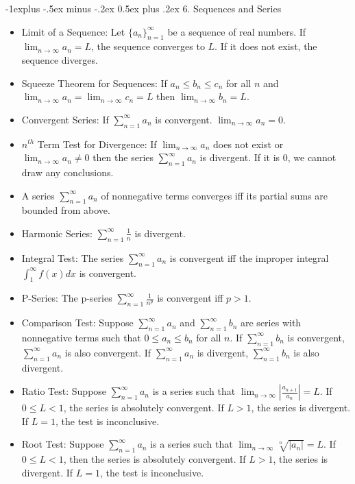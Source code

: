 \documentclass[10pt, portrait]{article}
\makeatletter
\renewcommand{\section}{\@startsection{section}{1}{0mm}%
                                {-1ex plus -.5ex minus -.2ex}%
                                {0.5ex plus .2ex}%
                                {\normalfont\large\bfseries}}
\renewcommand{\section}{\@startsection{section}{2}{0mm}%
                                {-1explus -.5ex minus -.2ex}%
                                {0.5ex plus .2ex}%
                                {\normalfont\normalsize\bfseries}}
\makeatother
\begin{document}
\begin{multicols*}{2}
\section{6. Sequences and Series}
\begin{itemize}
    \item Limit of a Sequence: Let $\{a_n\}_{n=1}^\infty$ be a sequence of real numbers. If $\lim_{n\to \infty}a_n=L$, the sequence converges to $L$. If it does not exist, the sequence diverges.
    \item Squeeze Theorem for Sequences: If $a_n\leq b_n \leq c_n$ for all $n$ and $\lim_{n \to \infty}a_n=\lim_{n \to \infty}c_n=L$ then $\lim_{n \to \infty}b_n=L$.
    \item Convergent Series: If $\sum_{n=1}^\infty a_n$ is convergent. $\lim_{n\to \infty}a_n=0$.
    \item $n^{th}$ Term Test for Divergence: If $\lim_{n\to \infty}a_n$ does not exist or $\lim_{n\to \infty}a_n \neq 0$ then the series $\sum_{n=1}^{\infty}a_n$ is divergent. If it is 0, we cannot draw any conclusions.
    \item A series $\sum_{n=1}^\infty a_n$ of nonnegative terms converges iff its partial sums are bounded from above.
    \item Harmonic Series: $\sum_{n=1}^{\infty}\frac{1}{n}$ is divergent.
    \item Integral Test: The series $\sum_{n=1}^\infty a_n$ is convergent iff the improper integral $\int_1^\infty f(x)dx$ is convergent.
    \item P-Series: The p-series $\sum_{n=1}^\infty \frac{1}{n^p}$ is convergent iff $p > 1$.
    \item Comparison Test: Suppose $\sum_{n=1}^\infty a_n$ and $\sum_{n=1}^\infty b_n$ are series with nonnegative terms such that $0 \leq a_n\leq b_n$ for all $n$. If $\sum_{n=1}^\infty b_n$ is convergent, $\sum_{n=1}^\infty a_n$ is also convergent. If $\sum_{n=1}^\infty a_n$ is divergent, $\sum_{n=1}^\infty b_n$ is also divergent.
    \item Ratio Test: Suppose $\sum_{n=1}^\infty a_n$ is a series such that $\lim_{n\to \infty}|\frac{a_{n+1}}{a_n}|=L$. If $0\leq L < 1$, the series is absolutely convergent. If $L>1$, the series is divergent. If $L=1$, the test is inconclusive.
    \item Root Test: Suppose $\sum_{n=1}^\infty a_n$ is a series such that $\lim_{n\to \infty}\sqrt[n]{|a_n|}=L$. If $0\leq L < 1$, then the series is absolutely convergent. If $L>1$, the series is divergent. If $L=1$, the test is inconclusive.

\end{itemize}
\end{multicols*}
\end{document}
